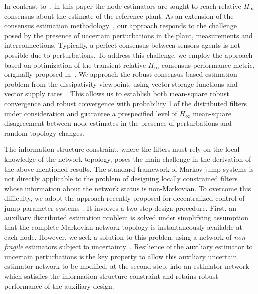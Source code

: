\documentclass[a4paper,twocolumn]{autart}
\begin{document}
In contrast to~\cite{SS-2009,SWH-2010}, in this paper the node
estimators are sought to reach relative $H_\infty$
consensus about the estimate of the reference plant. As an extension of the
consensus estimation methodology~\cite{Olfati-Saber-2007}, our approach
responds to the challenge posed by the presence of uncertain perturbations in
the plant, measurements and interconnections. Typically, a perfect consensus
between sensors-agents is not possible due to perturbations. 
To address this challenge, we employ
the approach based on optimization of the transient relative $H_\infty$
consensus performance metric, originally proposed 
in~\cite{U6}. We approach the robust
consensus-based estimation problem from the dissipativity viewpoint, 
using vector storage functions and vector supply rates~\cite{HCN-2004}. 
This allows us to establish both mean-square robust convergence and robust
convergence with probability 1 of the distributed filters under
consideration and guarantee a prespecified level of $H_\infty$
mean-square disagreement between node estimates in the presence of
perturbations and random topology changes.  

The information structure constraint, where the filters must rely on the local
knowledge of the network topology, poses the main challenge in
the derivation of the above-mentioned results. The
standard framework of Markov jump systems is not directly applicable
to the problem of designing locally constrained filters whose information
about the network status is non-Markovian. 
To overcome this difficulty, we adopt the approach recently proposed for 
decentralized control of jump parameter systems~\cite{XiUP1}. It involves a
two-step design procedure. First, an auxiliary distributed estimation
problem is solved under 
simplifying assumption that the complete Markovian network topology is
instantaneously available at each node. However, we seek a solution to
this problem using a network of \emph{non-fragile} estimators subject to
uncertainty~\cite{HC-2000}. Resilience of the auxiliary estimator to
uncertain perturbations is the key 
property to allow this auxiliary 
uncertain estimator network to be modified, at the second step, into an
estimator network which satisfies the information structure constraint and
retains robust performance of the auxiliary design.  
\end{document}
